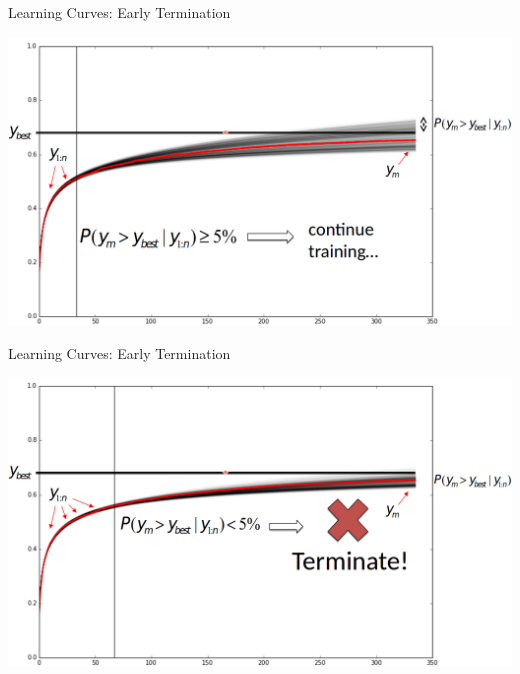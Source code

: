 \begin{frame}[c,fragile]{Learning Curves: Early Termination}

\centering
\includegraphics[width=\textwidth]{images/learning_curve_dec}

\end{frame}
\begin{frame}[c,fragile]{Learning Curves: Early Termination}

\centering
\includegraphics[width=\textwidth]{images/learning_curve_dec2}

\end{frame}
